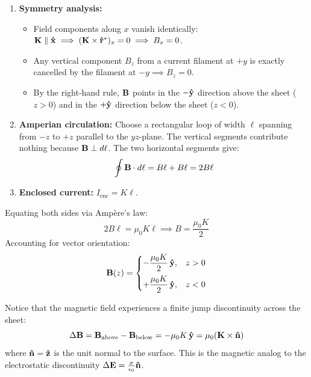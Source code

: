 \begin{enumerate}
    \item \textbf{Symmetry analysis:}
    \begin{itemize}
        \item Field components along $x$ vanish identically: $\vb{K} \parallel \vu{x} \implies (\vb{K} \times \vu{r}^*)_x = 0 \implies B_x = 0$.
        \item Any vertical component $B_z$ from a current filament at $+y$ is exactly cancelled by the filament at $-y \implies B_z = 0$.
        \item By the right-hand rule, $\vb{B}$ points in the $-\vu{y}$ direction above the sheet ($z > 0$) and in the $+\vu{y}$ direction below the sheet ($z < 0$).
    \end{itemize}
    \item \textbf{Amperian circulation:} Choose a rectangular loop of width $\ell$ spanning from $-z$ to $+z$ parallel to the $yz$-plane. The vertical segments contribute nothing because $\vb{B} \perp d\vb{\ell}$. The two horizontal segments give:
    \begin{equation}
        \oint \vb{B} \cdot d\vb{\ell} = B \ell + B \ell = 2 B \ell
    \end{equation}
    \item \textbf{Enclosed current:} $I_{\mathrm{enc}} = K \ell$.
\end{enumerate}
Equating both sides via Ampère's law:
\begin{equation}
    2 B \ell = \mu_0 K \ell \implies B = \frac{\mu_0 K}{2}
\end{equation}
Accounting for vector orientation:
\begin{equation}
    \vb{B}(z) = \begin{cases}
        -\dfrac{\mu_0 K}{2}\,\vu{y}, & z > 0 \\[8pt]
        +\dfrac{\mu_0 K}{2}\,\vu{y}, & z < 0
    \end{cases}
    \label{eq:sheet_b_field}
\end{equation}

\begin{remark}
Notice that the magnetic field experiences a finite jump discontinuity across the sheet:
\begin{equation}
    \Delta\vb{B} = \vb{B}_{\mathrm{above}} - \vb{B}_{\mathrm{below}} = -\mu_0 K\,\vu{y} = \mu_0 (\vb{K} \times \vu{n})
\end{equation}
where $\vu{n} = \vu{z}$ is the unit normal to the surface. This is the magnetic analog to the electrostatic discontinuity $\Delta\vb{E} = \frac{\sigma}{\epsilon_0}\vu{n}$.
\end{remark}

